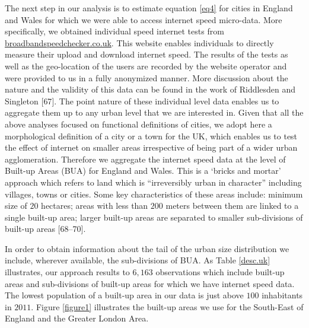 \documentclass[10pt,letterpaper]{article}
\begin{document}
The next step in our analysis is to estimate equation \ref{eq4} for
cities in England and Wales for which we were able to access internet
speed micro-data. More specifically, we obtained individual speed
internet tests from \url{broadbandspeedchecker.co.uk}. This website
enables individuals to directly measure their upload and download
internet speed. The results of the tests as well as the geo-location of
the users are recorded by the website operator and were provided to us
in a fully anonymized manner. More discussion about the nature and the
validity of this data can be found in the work of Riddlesden and
Singleton {[}67{]}. The point nature of these individual level data
enables us to aggregate them up to any urban level that we are
interested in. Given that all the above analyses focused on functional
definitions of cities, we adopt here a morphological definition of a
city or a town for the UK, which enables us to test the effect of
internet on smaller areas irrespective of being part of a wider urban
agglomeration. Therefore we aggregate the internet speed data at the
level of Built-up Areas (BUA) for England and Wales. This is a `bricks
and mortar' approach which refers to land which is ``irreversibly urban
in character'' including villages, towns or cities. Some key
characteristics of these areas include: minimum size of \(20\) hectares;
areas with less than \(200\) meters between them are linked to a single
built-up area; larger built-up areas are separated to smaller
sub-divisions of built-up areas {[}68--70{]}.

In order to obtain information about the tail of the urban size
distribution we include, wherever available, the sub-divisions of BUA.
As Table \ref{desc.uk} illustrates, our approach results to \(6,163\)
observations which include built-up areas and sub-divisions of built-up
areas for which we have internet speed data. The lowest population of a
built-up area in our data is just above \(100\) inhabitants in \(2011\).
Figure \ref{figure1} illustrates the built-up areas we use for the
South-East of England and the Greater London Area.
\end{document}
